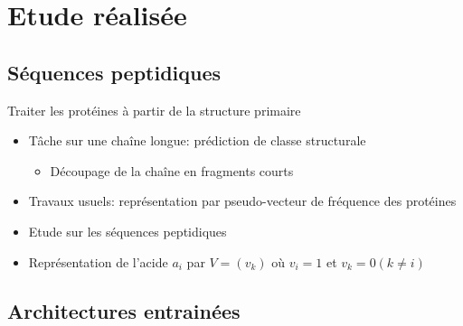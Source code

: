\documentclass{beamer}
\begin{document}
\section{Etude réalisée}

\subsection{Séquences peptidiques}

\begin{frame}{Traiter les protéines à partir de la structure primaire}

    \begin{itemize}
    \item Tâche sur une chaîne longue: prédiction de classe structurale\pause
      \begin{itemize}
      \item Découpage de la chaîne en fragments courts
      \end{itemize}
    \item Travaux usuels: représentation par pseudo-vecteur de fréquence des protéines\pause
    \item Etude sur les séquences peptidiques\pause
    \item Représentation de l'acide $a_i$ par $V = (v_k)$ où $v_i = 1$ et $v_k =
      0 (k\ne i)$
    \end{itemize}
\end{frame}

\subsection{Architectures entrainées}
\end{document}
